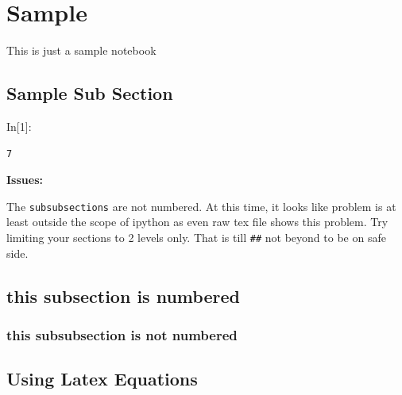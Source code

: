 \documentclass[float=false,crop=false]{standalone}
\begin{document}
    
    
    \maketitle
    
    

    
    \section{Sample}\label{sample}

This is just a sample notebook

\subsection{Sample Sub Section}\label{sample-sub-section}
\begin{InVerbatim}[commandchars=\\\{\},fontsize=\scriptsize]
{\color{incolor}In[{\color{incolor}1}]:} 
\end{InVerbatim}
    \begin{Verbatim}[commandchars=\\\{\},fontsize=\footnotesize]
7

    \end{Verbatim}

    \textbf{Issues:}

The \texttt{subsubsections} are not numbered. At this time, it looks
like problem is at least outside the scope of ipython as even raw tex
file shows this problem. Try limiting your sections to 2 levels only.
That is till \texttt{\#\#} not beyond to be on safe side.

\subsection{this subsection is
numbered}\label{this-subsection-is-numbered}

\subsubsection{this subsubsection is not
numbered}\label{this-subsubsection-is-not-numbered}

    \subsection{Using Latex Equations}\label{using-latex-equations}
\end{document}

